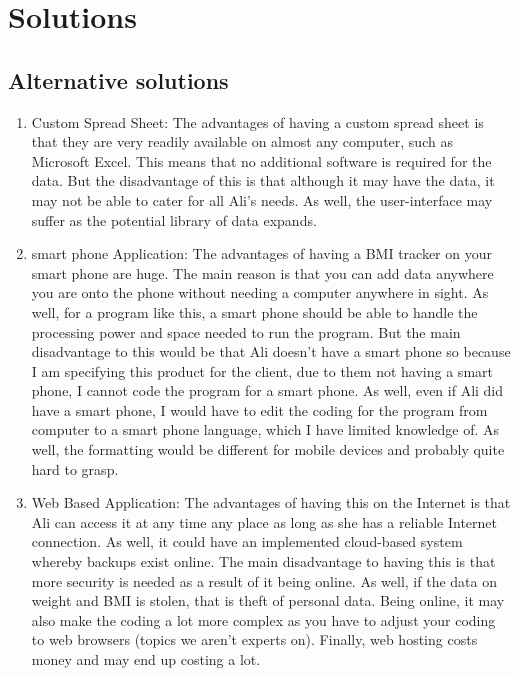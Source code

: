 \section{Solutions}

\subsection{Alternative solutions}

\begin{enumerate}
\item Custom Spread Sheet: The advantages of having a custom spread sheet is that they are very readily available on almost any computer, such as Microsoft Excel. This means that no additional software is required for the data. But the disadvantage of this is that although it may have the data, it may not be able to cater for all Ali's needs. As well, the user-interface may suffer as the potential library of data expands.

\item smart phone Application: The advantages of having a BMI tracker on your smart phone are huge. The main reason is that you can add data anywhere you are onto the phone without needing a computer anywhere in sight. As well, for a program like this, a smart phone should be able to handle the processing power and space needed to run the program. But the main disadvantage to this would be that Ali doesn't have a smart phone so because I am specifying this product for the client, due to them not having a smart phone, I cannot code the program for a smart phone. As well, even if Ali did have a smart phone, I would have to edit the coding for the program from computer to a smart phone language, which I have limited knowledge of. As well, the formatting would be different for mobile devices and probably quite hard to grasp.

\item Web Based Application: The advantages of having this on the Internet is that Ali can access it at any time any place as long as she has a reliable Internet connection. As well, it could have an implemented cloud-based system whereby backups exist online. The main disadvantage to having this is that more security is needed as a result of it being online. As well, if the data on weight and BMI is stolen, that is theft of personal data. Being online, it may also make the coding a lot more complex as you have to adjust your coding to web browsers (topics we aren't experts on). Finally, web hosting costs money and may end up costing a lot.


\end{enumerate}
